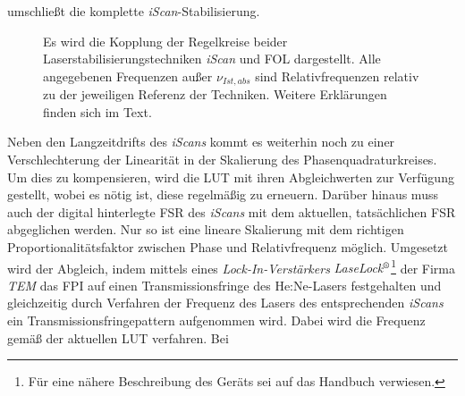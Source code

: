 umschließt die komplette \textit{iScan}-Stabilisierung.\par
\begin{figure}[h]
 	\centering
	\caption[Regelkreis - Kopplung]{Es wird die
	Kopplung der Regelkreise beider
	Laserstabilisierungstechniken \textit{iScan} und
	FOL dargestellt. Alle
	angegebenen Frequenzen außer $\nu_{Ist,abs}$ sind
	Relativfrequenzen relativ zu der jeweiligen
	Referenz der Techniken. Weitere Erklärungen
	finden sich im Text.}\label{fig:regelkreis_kopplung}
\end{figure}
Neben den Langzeitdrifts des \textit{iScans} kommt es weiterhin noch zu
einer Verschlechterung der Linearität in der Skalierung des
Phasenquadraturkreises.
Um dies zu kompensieren, wird die LUT mit ihren Abgleichwerten zur
Verfügung gestellt, wobei es nötig ist, diese regelmäßig zu erneuern.
Darüber hinaus muss auch der digital hinterlegte FSR des \textit{iScans} mit dem
aktuellen, tatsächlichen FSR abgeglichen werden. Nur so ist eine lineare
Skalierung mit dem richtigen Proportionalitätsfaktor zwischen Phase und
Relativfrequenz möglich. Umgesetzt wird der Abgleich, indem mittels eines
\textit{Lock-In-Verstärkers}
\textit{LaseLock$^\text{\textregistered}$}\footnote{Für eine nähere Beschreibung
des Geräts sei auf das Handbuch verwiesen.} der Firma \textit{TEM} \cite{laselock} das FPI auf einen Transmissionsfringe des He:Ne-Lasers festgehalten und gleichzeitig durch Verfahren der Frequenz des Lasers des entsprechenden \textit{iScans} ein Transmissionsfringepattern
aufgenommen wird. Dabei wird die Frequenz gemäß der aktuellen LUT verfahren. Bei
